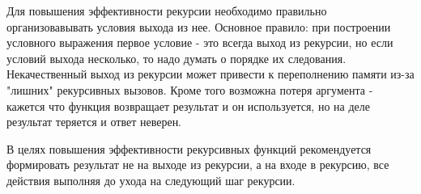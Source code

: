 \documentclass[a4paper,12pt]{article}
\begin{document}
Для повышения эффективности рекурсии необходимо правильно организовавывать условия выхода из нее. Основное правило: при построении условного выражения первое условие  - это всегда выход из рекурсии, но если условий выхода несколько, то надо думать о порядке их следования. Некачественный выход из рекурсии может привести к переполнению памяти из-за "лишних" рекурсивных вызовов. Кроме того возможна потеря аргумента - кажется что функция возвращает результат и он используется, но на деле результат теряется и ответ неверен.

В целях повышения эффективности рекурсивных функций рекомендуется формировать результат не на выходе из рекурсии, а на входе в рекурсию, все действия выполняя до ухода на следующий шаг рекурсии.
\end{document}
